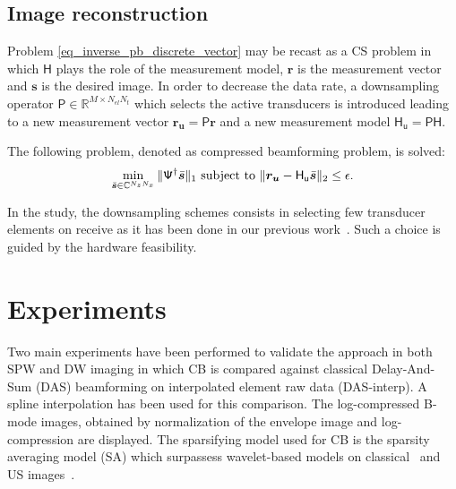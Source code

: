 \documentclass[conference]{IEEEtran}
\begin{document}
\subsection{Image reconstruction}
\label{subsec:image_recons}
Problem \eqref{eq_inverse_pb_discrete_vector} may be recast as a CS problem in which $\mathsf{H}$ plays the role of the measurement model, $\bm{r}$ is the measurement vector and $\bm{s}$ is the desired image. In order to decrease the data rate, a downsampling operator $\mathsf{P} \in \mathbb{R}^{M \times N_{el} N_{t}}$ which selects the active transducers is introduced leading to a new measurement vector  
$\bm{r_u} = \mathsf{P} \bm{r}$ and a new measurement model $\mathsf{H_u} = \mathsf{P} \mathsf{H}$. 
\par The following problem, denoted as compressed beamforming problem, is solved:
\begin{equation}\label{eq_compressed_beamforming}
\min_{\bar{\bm{s}}\in\mathbb{C}^{N_zN_x}}\|\mathsf{\Psi}^{\dagger}\bar{\bm{s}}\|_{1}
\textnormal{ subject to }\| \bm{r_u}-\mathsf{H_u}\bar{\bm{s}}\|_{2}\leq\epsilon.
\end{equation}
\par In the study, the downsampling schemes consists in selecting few transducer elements on receive as it has been done in our previous work~\cite{Besson_ICIP_2016}. Such a choice is guided by the hardware feasibility. 
\section{Experiments}
\label{sec:exp}
Two main experiments have been performed to validate the approach in both SPW and DW imaging in which CB is compared against classical Delay-And-Sum (DAS) beamforming on interpolated element raw data (DAS-interp). A spline interpolation has been used for this comparison. The log-compressed B-mode images, obtained by normalization of the envelope image and log-compression are displayed. The sparsifying model used for CB is the sparsity averaging model (SA) which surpassess wavelet-based models on classical~\cite{Carrillo_SPL_2012} and US images~\cite{Carrillo_IUS_2015}.
\end{document}
